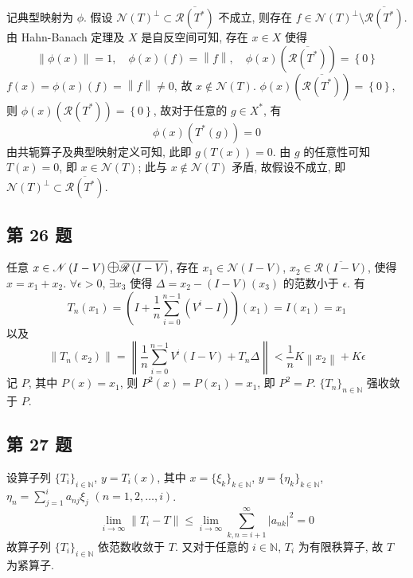 \documentclass[\ROOT/main.tex]{subfiles}
\begin{document}
记典型映射为 $\phi$.
假设 $\mathscr{N} \left( T \right)^\bot \subset \overline{\mathscr{R} \left( T^* \right)}$ 不成立, 则存在 $f \in \mathscr{N} \left( T \right)^\bot \setminus \overline{\mathscr{R} \left( T^* \right)}$.
由 Hahn-Banach 定理及 $X$ 是自反空间可知, 存在 $x \in X$ 使得
\[
    \left\| \phi \left( x \right) \right\| = 1
    , \quad
    \phi \left( x \right) \left( f \right) = \left\| f \right\|
    , \quad
    \phi \left( x \right) \left( \overline{\mathscr{R} \left( T^* \right)} \right) = \left\{ 0 \right\}
\]
$f \left( x \right) = \phi \left( x \right) \left( f \right) = \left\| f \right\| \neq 0$, 故 $x \notin \mathscr{N} \left( T \right)$.
$\phi \left( x \right) \left( \overline{\mathscr{R} \left( T^* \right)} \right) = \left\{ 0 \right\}$,
则 $\phi \left( x \right) \left( \mathscr{R} \left( T^* \right) \right) = \left\{ 0 \right\}$,
故对于任意的 $g \in X^*$, 有
\[
    \phi \left( x \right) \left( T^* \left( g \right) \right) = 0
\]
由共轭算子及典型映射定义可知, 此即 $g \left( T \left( x \right) \right) = 0$.
由 $g$ 的任意性可知 $T \left( x \right) = 0$, 即 $x \in \mathscr{N} \left( T \right)$;
此与 $x \notin \mathscr{N} \left( T \right)$ 矛盾, 故假设不成立,
即 $\mathscr{N} \left( T \right)^\bot \subset \overline{\mathscr{R} \left( T^* \right)}$.

\subsection{第 26 题}
任意 $x \in \mathscr{N} \left( I - V \right) \mathlarger{\mathlarger{\mathlarger{\oplus}}} \overline{\mathscr{R} \left( I - V \right)}$,
存在 $x_1 \in \mathscr{N} \left( I - V \right)$, $x_2 \in \overline{\mathscr{R} \left( I - V \right)}$, 使得 $x = x_1 + x_2$.
$\forall \epsilon > 0$, $\exists x_3$ 使得 $\Delta = x_2 - \left( I - V \right) \left( x_3 \right)$ 的范数小于 $\epsilon$.
有
\[
    T_n \left( x_1 \right)
    = \left( I + \frac{1}{n} \sum_{i = 0}^{n - 1} \left( V^{i} - I \right) \right) \left( x_1 \right)
    = I \left( x_1 \right)
    = x_1
\]
以及
\[
    \left\| T_n \left( x_2 \right) \right\|
    = \left\| \frac{1}{n} \sum_{i = 0}^{n - 1} V^i \left( I - V \right) + T_n \Delta \right\|
    < \frac{1}{n} K \left\| x_2 \right\| + K \epsilon
\]
记 $P$, 其中 $P \left( x \right) = x_1$, 则 $P^2 \left( x \right) = P \left( x_1 \right) = x_1$, 即 $P^2 = P$.
$\{ T_{n} \}_{n \in \mathbb{N}}$ 强收敛于 $P$.

\subsection{第 27 题}
设算子列 $\{ T_{i} \}_{i \in \mathbb{N}}$, $y = T_i \left( x \right)$,
其中 $x = \{ \xi_{k} \}_{k \in \mathbb{N}}$, $y = \{ \eta_{k} \}_{k \in \mathbb{N}}$, $\eta_n = \sum_{j = 1}^{i} a_{n j} \xi_j$ $(n = 1, 2, \dots , i)$.
\[
    \lim_{i \to \infty} \left\| T_i - T \right\|
    \leqslant \lim_{i \to \infty} \sum_{k, n = i + 1}^{\infty} \left| a_{n k} \right|^2
    = 0
\]
故算子列 $\{ T_{i} \}_{i \in \mathbb{N}}$ 依范数收敛于 $T$.
又对于任意的 $i \in \mathbb{N}$, $T_i$ 为有限秩算子, 故 $T$ 为紧算子.
\end{document}
